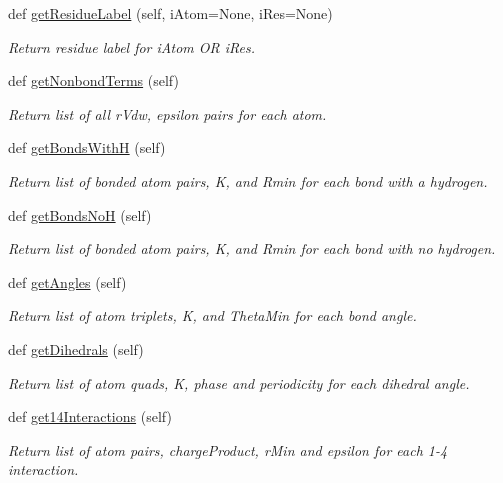 \begin{DoxyCompactItemize}
def \hyperlink{classsrc_1_1amberio_1_1PrmtopLoader_a75f9c306f8321358b533f67d5354f1b1}{get\+Residue\+Label} (self, i\+Atom=None, i\+Res=None)
\begin{DoxyCompactList}\small\item\em Return residue label for i\+Atom OR i\+Res. \end{DoxyCompactList}\item 
def \hyperlink{classsrc_1_1amberio_1_1PrmtopLoader_a23d0b10c76fb39e206cf6841ff6f56ce}{get\+Nonbond\+Terms} (self)
\begin{DoxyCompactList}\small\item\em Return list of all r\+Vdw, epsilon pairs for each atom. \end{DoxyCompactList}\item 
def \hyperlink{classsrc_1_1amberio_1_1PrmtopLoader_ab75f7fa3f828685a1959e8c0f270f3ec}{get\+Bonds\+WithH} (self)
\begin{DoxyCompactList}\small\item\em Return list of bonded atom pairs, K, and Rmin for each bond with a hydrogen. \end{DoxyCompactList}\item 
def \hyperlink{classsrc_1_1amberio_1_1PrmtopLoader_af8e39923b6f949eb7db0264b4e26a2c5}{get\+Bonds\+NoH} (self)
\begin{DoxyCompactList}\small\item\em Return list of bonded atom pairs, K, and Rmin for each bond with no hydrogen. \end{DoxyCompactList}\item 
def \hyperlink{classsrc_1_1amberio_1_1PrmtopLoader_a1dd2758d21107eae79a1766e55c33708}{get\+Angles} (self)
\begin{DoxyCompactList}\small\item\em Return list of atom triplets, K, and Theta\+Min for each bond angle. \end{DoxyCompactList}\item 
def \hyperlink{classsrc_1_1amberio_1_1PrmtopLoader_a24dfb8d7303f2e04a6617589ce59d7c2}{get\+Dihedrals} (self)
\begin{DoxyCompactList}\small\item\em Return list of atom quads, K, phase and periodicity for each dihedral angle. \end{DoxyCompactList}\item 
def \hyperlink{classsrc_1_1amberio_1_1PrmtopLoader_a854cac838bde307ba4c069ba58b71cb6}{get14\+Interactions} (self)
\begin{DoxyCompactList}\small\item\em Return list of atom pairs, charge\+Product, r\+Min and epsilon for each 1-\/4 interaction. \end{DoxyCompactList}\item 

\end{DoxyCompactItemize}
